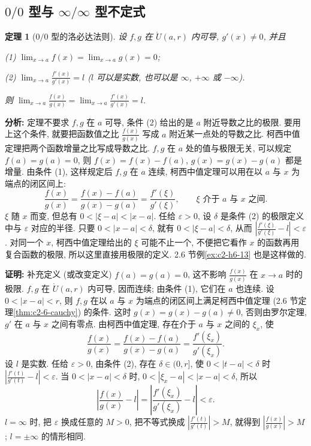 \documentclass[UTF8,openany]{ctexbook}
\theoremstyle{chinesetextbook}
\newtheorem{theorem}{定理}[section]
\newenvironment{cnproof}{\par\indent\textbf{证明:} \ignorespaces}{\par}
\begin{document}
\subsection{\texorpdfstring{$0/0$ 型与 $\infty/\infty$ 型不定式}{0/0 型与 ∞/∞ 型不定式}}
\begin{theorem}[$0/0$ 型的洛必达法则]\label{thm:c2-7-lh1}
设 $f,g$ 在 $\mathring U(a,r)$ 内可导, $g'(x)\ne0$, 并且

\textup{(1)} $\displaystyle\lim_{x\to a}f(x)=\lim_{x\to a}g(x)=0$;

\textup{(2)} $\displaystyle\lim_{x\to a}\frac{f'(x)}{g'(x)}=l$ ($l$ 可以是实数, 也可以是 $\infty$, $+\infty$ 或 $-\infty$).

则 $\displaystyle\lim_{x\to a}\frac{f(x)}{g(x)}=\lim_{x\to a}\frac{f'(x)}{g'(x)}=l$.
\end{theorem}
\par\indent\textbf{分析:} 定理不要求 $f,g$ 在 $a$ 可导, 条件 (2) 给出的是 $a$ 附近导数之比的极限. 要用上这个条件, 就要把函数值之比 $\displaystyle\frac{f(x)}{g(x)}$ 写成 $a$ 附近某一点处的导数之比. 柯西中值定理把两个函数增量之比写成导数之比. $f,g$ 在 $a$ 处的值与极限无关, 可以规定 $f(a)=g(a)=0$, 则 $f(x)=f(x)-f(a)$, $g(x)=g(x)-g(a)$ 都是增量. 由条件 (1), 这样规定后 $f,g$ 在 $a$ 连续, 柯西中值定理可以用在以 $a$ 与 $x$ 为端点的闭区间上:
\[
\frac{f(x)}{g(x)}=\frac{f(x)-f(a)}{g(x)-g(a)}=\frac{f'(\xi)}{g'(\xi)},\qquad\xi\text{ 介于 }a\text{ 与 }x\text{ 之间}.
\]
$\xi$ 随 $x$ 而变, 但总有 $0<|\xi-a|<|x-a|$. 任给 $\varepsilon>0$, 设 $\delta$ 是条件 (2) 的极限定义中与 $\varepsilon$ 对应的半径. 只要 $0<|x-a|<\delta$, 就有 $0<|\xi-a|<\delta$, 从而 $\displaystyle\left|\frac{f'(\xi)}{g'(\xi)}-l\right|<\varepsilon$. 对同一个 $x$, 柯西中值定理给出的 $\xi$ 可能不止一个, 不便把它看作 $x$ 的函数再用复合函数的极限, 所以这里直接用极限的定义. 2.6 节例\ref{ex:c2-h6-13} 也是这样做的.
\begin{cnproof}
补充定义 (或改变定义) $f(a)=g(a)=0$, 这不影响 $\displaystyle\frac{f(x)}{g(x)}$ 在 $x\to a$ 时的极限. $f,g$ 在 $\mathring U(a,r)$ 内可导, 因而连续; 由条件 (1), 它们在 $a$ 也连续. 设 $0<|x-a|<r$, 则 $f,g$ 在以 $a$ 与 $x$ 为端点的闭区间上满足柯西中值定理 (2.6 节定理\ref{thm:c2-6-cauchy}) 的条件. 这时 $g(x)=g(x)-g(a)\ne0$, 否则由罗尔定理, $g'$ 在 $a$ 与 $x$ 之间有零点. 由柯西中值定理, 存在介于 $a$ 与 $x$ 之间的 $\xi_x$, 使
\[
\frac{f(x)}{g(x)}=\frac{f(x)-f(a)}{g(x)-g(a)}=\frac{f'(\xi_x)}{g'(\xi_x)}.
\]
设 $l$ 是实数. 任给 $\varepsilon>0$, 由条件 (2), 存在 $\delta\in(0,r]$, 使 $0<|t-a|<\delta$ 时 $\displaystyle\left|\frac{f'(t)}{g'(t)}-l\right|<\varepsilon$. 当 $0<|x-a|<\delta$ 时, $0<|\xi_x-a|<|x-a|<\delta$, 所以
\[
\left|\frac{f(x)}{g(x)}-l\right|=\left|\frac{f'(\xi_x)}{g'(\xi_x)}-l\right|<\varepsilon.
\]
$l=\infty$ 时, 把 $\varepsilon$ 换成任意的 $M>0$, 把不等式换成 $\displaystyle\left|\frac{f'(t)}{g'(t)}\right|>M$, 就得到 $\displaystyle\left|\frac{f(x)}{g(x)}\right|>M$; $l=\pm\infty$ 的情形相同.
\end{cnproof}
\end{document}
